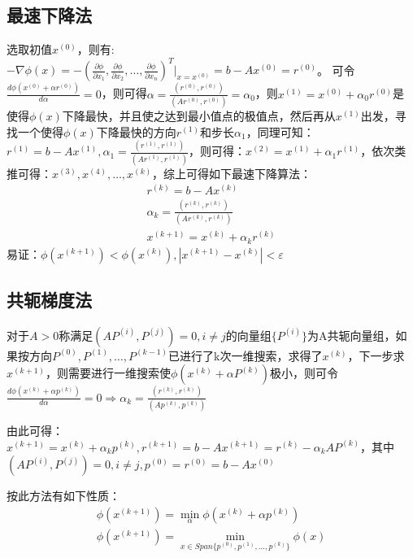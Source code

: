\documentclass[a4paper]{article}
\begin{document}
\subsection{最速下降法}
选取初值$x^{(0)} $，则有:$-\nabla \phi(x)=-(\frac{\partial \phi}{\partial x_1}, \frac{\partial \phi}{\partial x_2}, \dots, \frac{\partial \phi}{\partial x_n})^T|_{x=x^{(0)}} =b-Ax^{(0)}=r^{(0)} $。
可令$\frac{d\phi(x^{(0)}+\alpha r^{(0)})}{d\alpha}=0$，则可得$\alpha = \frac{(r^{(0)}, r^{(0)})}{(Ar^{(0)}, r^{(0)})}=\alpha_0$，则$x^{(1)}=x^{(0)}+\alpha_0r^{(0)} $是
使得$\phi(x)$下降最快，并且使之达到最小值点的极值点，然后再从$x^{(1)}$出发，寻找一个使得$\phi(x)$下降最快的方向$r^{(1)} $和步长$\alpha_1$，同理可知：
$r^{(1)}=b-Ax^{(1)},\alpha_1=\frac{(r^{(1)}, r^{(1)})}{(Ar^{(1)}, r^{(1)})} $，则可得：$x^{(2)}=x^{(1)}+\alpha_1r^{(1)}$，依次类推可得：$x^{(3)}, x^{(4)}, \dots, x^{(k)}$，综上可得如下最速下降算法：
\begin{equation}
  \begin{array}{lr}
    r^{(k)}=b-Ax^{(k)} \\
    \alpha_k = \frac{(r^{(k)}, r^{(k)})}{(Ar^{(k)}, r^{(k)})} \\
    x^{(k+1)}=x^{(k)}+\alpha_kr^{(k)}
  \end{array}
\end{equation}
易证：$\phi(x^{(k+1)}) < \phi(x^{(k)}),|x^{(k+1)}-x^{(k)}|<\varepsilon$

\subsection{共轭梯度法}
对于$A>0$称满足$(AP^{(i)}, P^{(j)})=0, i\neq j$的向量组$\{P^{(i)}\}$为A共轭向量组，如果按方向$P^{(0)}, P^{(1)}, \dots, P^{(k-1)}$已进行了k次一维搜索，求得了$x^{(k)} $，下一步求
$x^{(k+1)} $，则需要进行一维搜索使$\phi(x^{(k)}+\alpha P^{(k)}) $极小，则可令$\frac{d\phi(x^{(k)}+\alpha p^{(k)})}{d\alpha}=0 \Rightarrow \alpha_k = \frac{(r^{(k)}, r^{(k)})}{(Ap^{(k)}, p^{(k)})}$

由此可得：$x^{(k+1)}=x^{(k)}+\alpha_kp^{(k)}, r^{(k+1)}=b-Ax^{(k+1)}=r^{(k)}-\alpha_kAP^{(k)} $，其中$(AP^{(i)}, P^{(j)})=0, i\neq j, p^{(0)}=r^{(0)}=b-Ax^{(0)} $

按此方法有如下性质：
\begin{equation*}
  \begin{array}{lr}
    \phi(x^{(k+1)})=\min_\alpha\phi(x^{(k)}+\alpha p^{(k)}) \\
    \phi(x^{(k+1)}) = \min_{x\in Span\{p^{(0)}, p^{(1)}, \dots, p^{(k)} \}} \phi(x)
  \end{array}
\end{equation*}
\end{document}
